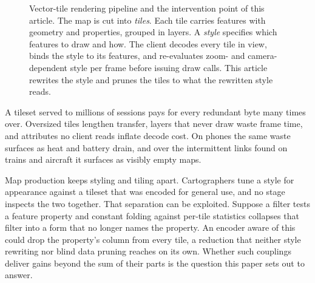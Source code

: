 \begin{figure}[htbp]
    \caption{Vector-tile rendering pipeline and the intervention point of this article.
    The map is cut into \emph{tiles}.
    Each tile carries features with geometry and properties, grouped in layers.
    A \emph{style} specifies which features to draw and how.
    The client decodes every tile in view, binds the style to its features, and re-evaluates zoom- and camera-dependent style per frame before issuing draw calls.
    This article rewrites the style and prunes the tiles to what the rewritten style reads.}
    \label{fig:pipeline_overview}
\end{figure}

A tileset served to millions of sessions pays for every redundant byte many times over.
Oversized tiles lengthen transfer, layers that never draw waste frame time, and attributes no client reads inflate decode cost.
On phones the same waste surfaces as heat and battery drain, and over the intermittent links found on trains and aircraft it surfaces as visibly empty maps.

Map production keeps styling and tiling apart.
Cartographers tune a style for appearance against a tileset that was encoded for general use, and no stage inspects the two together.
That separation can be exploited.
Suppose a filter tests a feature property and constant folding against per-tile statistics collapses that filter into a form that no longer names the property.
An encoder aware of this could drop the property's column from every tile, a reduction that neither style rewriting nor blind data pruning reaches on its own.
Whether such couplings deliver gains beyond the sum of their parts is the question this paper sets out to answer.


